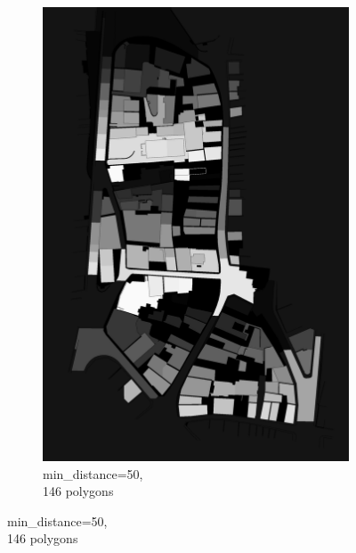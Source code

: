 \documentclass[12pt]{article}
\begin{document}
\begin{figure}[H]
\begin{subfigure}[b]{.3\textwidth}
		\includegraphics[width=1\linewidth]{images/polygon_recovery/watershed1_distance50_146.png}  
		\caption{min\_distance=50, \\ 146 polygons}
	\end{subfigure}
	

\end{figure}
\end{document}
